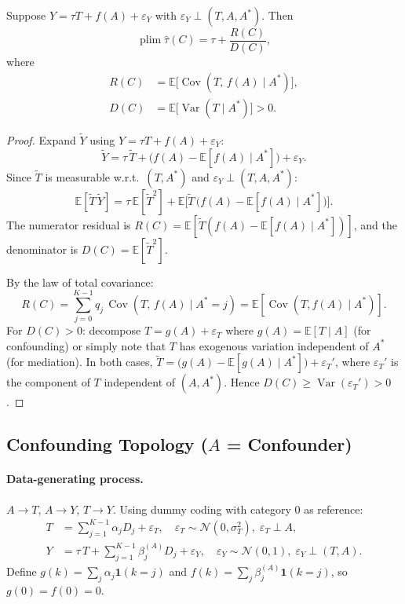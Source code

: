 \begin{lemma}
\label{lem:bias_decomp}
Suppose $Y = \tau T + f(A) + \varepsilon_Y$ with $\varepsilon_Y \perp (T, A, A^*)$.
Then
\begin{equation}
  \operatorname{plim}\hat\tau(C) = \tau + \frac{R(C)}{D(C)},
  \label{eq:bias_decomp}
\end{equation}
where
\begin{align}
  R(C) &= \mathbb{E}\bigl[\operatorname{Cov}(T,\,f(A)\mid A^*)\bigr], \label{eq:R}\\
  D(C) &= \mathbb{E}\bigl[\operatorname{Var}(T\mid A^*)\bigr] > 0. \label{eq:D}
\end{align}
\end{lemma}

\begin{proof}
Expand $\tilde{Y}$ using $Y=\tau T + f(A) + \varepsilon_Y$:
\[
  \tilde{Y} = \tau\,\tilde{T} + \bigl(f(A) - \mathbb{E}[f(A)\mid A^*]\bigr) + \varepsilon_Y.
\]
Since $\tilde{T}$ is measurable w.r.t.\ $(T,A^*)$ and $\varepsilon_Y\perp(T,A,A^*)$:
\[
  \mathbb{E}[\tilde{T}\,\tilde{Y}]
  = \tau\,\mathbb{E}[\tilde{T}^2]
  + \mathbb{E}\bigl[\tilde{T}\,\bigl(f(A)-\mathbb{E}[f(A)\mid A^*]\bigr)\bigr].
\]
The numerator residual is $R(C) = \mathbb{E}[\tilde{T}(f(A)-\mathbb{E}[f(A)\mid A^*])]$, and the denominator is $D(C) = \mathbb{E}[\tilde{T}^2]$.

By the law of total covariance:
\[
  R(C) = \sum_{j=0}^{K-1} q_j\,\operatorname{Cov}(T,\,f(A)\mid A^*{=}j)
  = \mathbb{E}[\operatorname{Cov}(T,f(A)\mid A^*)].
\]
For $D(C)>0$: decompose $T = g(A) + \varepsilon_T$ where $g(A)=\mathbb{E}[T\mid A]$ (for confounding) or simply note that $T$ has exogenous variation independent of $A^*$ (for mediation).
In both cases, $\tilde{T}=\bigl(g(A)-\mathbb{E}[g(A)\mid A^*]\bigr)+\varepsilon_T'$, where $\varepsilon_T'$ is the component of $T$ independent of $(A,A^*)$.
Hence $D(C)\geq\operatorname{Var}(\varepsilon_T')>0$.
\end{proof}

\subsection{Confounding Topology ($A$ = Confounder)}
\label{app:confounding}

\paragraph{Data-generating process.}
$A\to T$, $A\to Y$, $T\to Y$.
Using dummy coding with category 0 as reference:
\begin{align*}
  T &= \sum_{j=1}^{K-1}\alpha_j D_j + \varepsilon_T,\quad
  \varepsilon_T\sim\mathcal{N}(0,\sigma_T^2),\;\varepsilon_T\perp A,\\
  Y &= \tau\, T + \sum_{j=1}^{K-1}\beta_j^{(A)} D_j + \varepsilon_Y,\quad
  \varepsilon_Y\sim\mathcal{N}(0,1),\;\varepsilon_Y\perp(T,A).
\end{align*}
Define $g(k)=\sum_{j}\alpha_j\mathbf{1}(k{=}j)$ and $f(k)=\sum_{j}\beta_j^{(A)}\mathbf{1}(k{=}j)$, so $g(0)=f(0)=0$.

